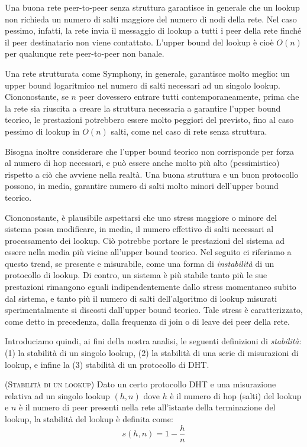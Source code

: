 \documentclass[prodmode,acmtap]{acmlarge}
\begin{document}
Una buona rete peer-to-peer senza struttura garantisce in generale che un lookup non richieda un numero di salti maggiore del numero di nodi della rete. Nel caso pessimo, infatti, la rete invia il messaggio di lookup a tutti i peer della rete finché il peer destinatario non viene contattato. L'upper bound del lookup è cioè $O(n)$ per qualunque rete peer-to-peer non banale.

Una rete strutturata come Symphony, in generale, garantisce molto meglio: un upper bound logaritmico nel numero di salti necessari ad un singolo lookup.
Ciononostante, se $n$ peer dovessero entrare tutti contemporaneamente, prima che la rete sia riuscita a creare la struttura necessaria a garantire l'upper bound teorico, le prestazioni potrebbero essere molto peggiori del previsto, fino al caso pessimo di lookup in $O(n)$ salti, come nel caso di rete senza struttura.

Bisogna inoltre considerare che l'upper bound teorico non corrisponde per forza al numero di hop necessari, e può essere anche molto più alto (pessimistico) rispetto a ciò che avviene nella realtà. Una buona struttura e un buon protocollo possono, in media, garantire numero di salti molto minori dell'upper bound teorico.

Ciononostante, è plausibile aspettarsi che uno stress maggiore o minore del sistema possa modificare, in media, il numero effettivo di salti necessari al processamento dei lookup. Ciò potrebbe portare le prestazioni del sistema ad essere nella media più vicine all'upper bound teorico. Nel seguito ci riferiamo a questo trend, se presente e misurabile, come una forma di \emph{instabilità} di un protocollo di lookup. Di contro, un sistema è più stabile tanto più le sue prestazioni rimangono eguali indipendentemente dallo stress momentaneo subito dal sistema, e tanto più il numero di salti dell'algoritmo di lookup misurati sperimentalmente si discosti dall'upper bound teorico. Tale stress è caratterizzato, come detto in precedenza, dalla frequenza di join o di leave dei peer della rete.

Introduciamo quindi, ai fini della nostra analisi, le seguenti definizioni di \emph{stabilità}: (1) la stabilità di un singolo lookup, (2) la stabilità di una serie di misurazioni di lookup, e infine la (3) stabilità di un protocollo di DHT.

\begin{definition}{(\textsc{Stabilità di un lookup})}
Dato un certo protocollo DHT e una misurazione relativa ad un singolo lookup $(h,n)$ dove $h$ è il numero di hop (salti) del lookup e $n$ è il numero di peer presenti nella rete all'istante della terminazione del lookup, la stabilità del lookup è definita come:
$$ s(h,n) = 1 - \frac{h}{n} $$
\end{definition}
\end{document}
